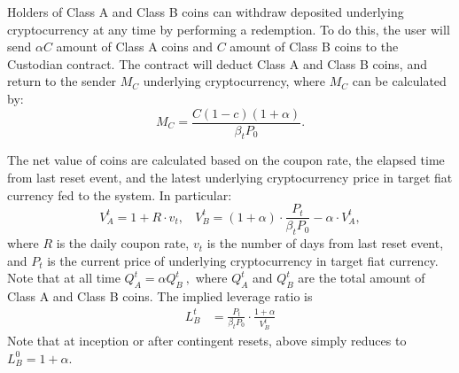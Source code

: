 \documentclass[11pt]{article}%
\numberwithin{equation}{section}
\theoremstyle{plain}
\begin{document}
\begin{appendices}

Holders of Class A and Class B coins can withdraw deposited underlying cryptocurrency at any time by performing a redemption. To do this, the user will send $\alpha C$ amount of Class A coins and $C$ amount of Class B coins to the Custodian contract. The contract will deduct Class A and Class B coins, and return to the sender $M_{C}$ underlying cryptocurrency, where $M_{C}$ can be calculated by:
\begin{equation}
M_{C}=\frac{C \left(1-c\right) \left(1+\alpha\right)}{\beta_t P_{0}}.
\label{eq:redemption-1}
\end{equation}


The net value of coins are calculated based on the coupon rate, the elapsed time from last reset event, and the latest underlying cryptocurrency price in target fiat currency fed to the system. In particular:
\begin{equation}
V_{A}^{t}=  1+R\cdot v_t,~~~~
V_{B}^{t}=  \left(1+\alpha\right)\cdot\frac{P_{t}}{\beta_tP_{0}}-\alpha\cdot V_{A}^{t} ,
\label{eq:netvalue-1}
\end{equation}
where $R$ is the daily coupon rate, $v_t$ is the number of days from last reset event, and $P_{t}$ is the current price of underlying cryptocurrency in target fiat currency.
Note that at all time
$
Q_{A}^{t}=\alpha Q_{B}^{t}\ ,
$
where $Q_{A}^{t}$ and $Q_{B}^{t}$ are the total amount of Class A and Class B coins.
The implied leverage ratio is
\begin{align*}
L_{B}^{t} & =\frac{P_{t}}{\beta_tP_{0}}\cdot\frac{1+\alpha}{V_{B}^{t}}
\end{align*}
Note that at inception or after contingent resets, above simply reduces to $L_{B}^{0}=1+\alpha$.


\end{appendices}
\end{document}
